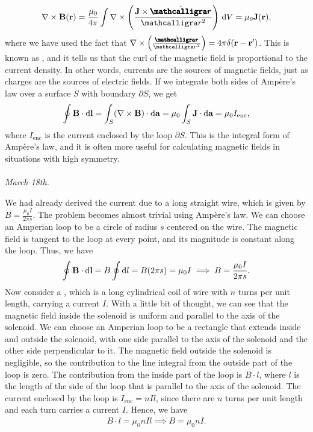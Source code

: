 \begin{align}
    \nabla \times \bv{B}(\bv{r}) = \frac{\mu_{0}}{4 \pi} \int \nabla \times \left( \frac{\bv{J} \times \hat{\bcurs{r}}}{\curs{r}^{2}} \right) \, \di{V} = \mu_{0} \bv{J}(\bv{r}),
\end{align}
where we have used the fact that $\nabla \times \left( \frac{\hat{\bcurs{r}}}{\curs{r}^{2}} \right) = 4 \pi \delta(\bv{r} - \bv{r}')$. This is known as , and it tells us that the curl of the magnetic field is proportional to the current density. In other words, currents are the sources of magnetic fields, just as charges are the sources of electric fields. If we integrate both sides of Ampère's law over a surface $S$ with boundary $\partial S$, we get
\begin{align}
    \oint \mathbf{B} \cdot \mathrm{d}\mathbf{l} = \int_{S} (\nabla \times \mathbf{B}) \cdot \mathrm{d}\mathbf{a} = \mu_{0} \int_{S} \mathbf{J} \cdot \mathrm{d}\mathbf{a} = \mu_{0} I_{\text{enc}},
\end{align}
where $I_{\text{enc}}$ is the current enclosed by the loop $\partial S$. This is the integral form of Ampère's law, and it is often more useful for calculating magnetic fields in situations with high symmetry.
\\ \\
\noindent \textit{March 18th.}

We had already derived the current due to a long straight wire, which is given by $B = \frac{\mu_{0} I}{2 \pi s}$. The problem becomes almost trivial using Ampère's law. We can choose an Amperian loop to be a circle of radius $s$ centered on the wire. The magnetic field is tangent to the loop at every point, and its magnitude is constant along the loop. Thus, we have
\begin{align}
\oint \mathbf{B} \cdot \mathrm{d}\mathbf{l} = B \oint \mathrm{d}l = B (2 \pi s) = \mu_{0} I \implies B = \frac{\mu_{0} I}{2 \pi s}.
\end{align}
Now consider a , which is a long cylindrical coil of wire with $n$ turns per unit length, carrying a current $I$. With a little bit of thought, we can see that the magnetic field inside the solenoid is uniform and parallel to the axis of the solenoid. We can choose an Amperian loop to be a rectangle that extends inside and outside the solenoid, with one side parallel to the axis of the solenoid and the other side perpendicular to it. The magnetic field outside the solenoid is negligible, so the contribution to the line integral from the outside part of the loop is zero. The contribution from the inside part of the loop is $B \cdot l$, where $l$ is the length of the side of the loop that is parallel to the axis of the solenoid. The current enclosed by the loop is $I_{\text{enc}} = n I l$, since there are $n$ turns per unit length and each turn carries a current $I$. Hence, we have
\begin{align}
B \cdot l = \mu_{0} n I l \implies B = \mu_{0} n I.
\end{align}

